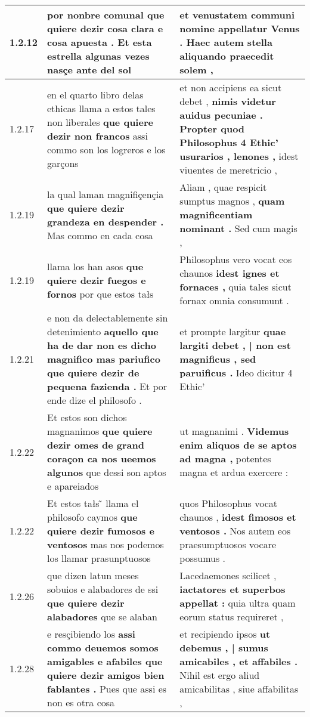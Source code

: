 \begin{tabular}{|p{1cm}|p{6.5cm}|p{6.5cm}|}
1.2.12 & por nonbre comunal \textbf{ que quiere dezir cosa clara e cosa apuesta . } Et esta estrella algunas vezes nasçe ante del sol & et venustatem communi nomine \textbf{ appellatur Venus . } Haec autem stella aliquando praecedit solem , \\\hline
1.2.17 & en el quarto libro delas ethicas llama a estos tales non liberales \textbf{ que quiere dezir non francos } assi commo son los logreros e los garçons & et non accipiens ea sicut debet , \textbf{ nimis videtur auidus pecuniae . Propter quod Philosophus 4 Ethic’ usurarios , lenones , } idest viuentes de meretricio , \\\hline
1.2.19 & la qual laman magnifiçençia \textbf{ que quiere dezir grandeza en despender . } Mas commo en cada cosa & Aliam , quae respicit sumptus magnos , \textbf{ quam magnificentiam nominant . } Sed cum magis , \\\hline
1.2.19 & llama los han asos \textbf{ que quiere dezir fuegos e fornos } por que estos tałs & Philosophus vero vocat eos chaunos \textbf{ idest ignes et fornaces , } quia tales sicut fornax omnia consumunt . \\\hline
1.2.21 & e non da delectablemente sin detenimiento \textbf{ aquello que ha de dar non es dicho magnifico mas pariufico que quiere dezir de pequena fazienda . } Et por ende dize el philosofo . & et prompte largitur \textbf{ quae largiti debet , | non est magnificus , sed paruificus . } Ideo dicitur 4 Ethic’ \\\hline
1.2.22 & Et estos son dichos magnanimos \textbf{ que quiere dezir omes de grand coraçon ca nos ueemos algunos } que dessi son aptos e apareiados & ut magnanimi . \textbf{ Videmus enim aliquos de se aptos ad magna , } potentes magna et ardua exercere : \\\hline
1.2.22 & Et estos tałs ̃ llama el philosofo caymos \textbf{ que quiere dezir fumosos e ventosos } mas nos podemos los llamar prasunptuosos & quos Philosophus vocat chaunos , \textbf{ idest fimosos et ventosos . } Nos autem eos praesumptuosos vocare possumus . \\\hline
1.2.26 & que dizen latun meses sobuios e alabadores de ssi \textbf{ que quiere dezir alabadores } que se alaban & Lacedaemones scilicet , \textbf{ iactatores et superbos appellat : } quia ultra quam eorum status requireret , \\\hline
1.2.28 & e resçibiendo los \textbf{ assi commo deuemos somos amigables e afabiles que quiere dezir amigos bien fablantes . } Pues que assi es non es otra cosa & et recipiendo ipsos \textbf{ ut debemus , | sumus amicabiles , et affabiles . } Nihil est ergo aliud amicabilitas , siue affabilitas , \\\hline

\end{tabular}
